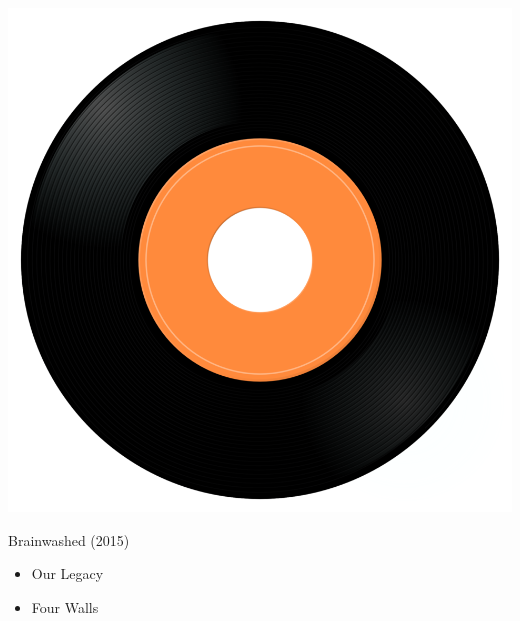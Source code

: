 \begin{minipage}[t]{0.25\textwidth}\vspace{0pt}
\captionsetup{type=figure}
\includegraphics[width=\textwidth]{Images/cover.png}
\caption*{Brainwashed (2015)}
\end{minipage}
\begin{minipage}[t]{0.25\textwidth}\vspace{0pt}
\begin{itemize}[nosep,leftmargin=1em,labelwidth=*,align=left]
	\setlength{\itemsep}{0pt}
	\item Our Legacy
	\item Four Walls
\end{itemize}
\end{minipage}
